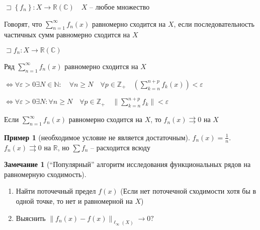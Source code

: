 \documentclass{book}
\newcommand\N{\ensuremath{\mathbb{N}}}
\newcommand\R{\ensuremath{\mathbb{R}}}
\newcommand\Z{\ensuremath{\mathbb{Z}}}
\renewcommand\C{\ensuremath{\mathbb{C}}}
\theoremstyle{definition}
\newtheorem*{note}{Замечание}
\newtheorem*{example}{Пример}
\begin{document}
    \begin{definition}
        $\sqsupset \left\{ f_n \right\}: X\to \R(\C)\quad X$ -- любое множество

        Говорят, что $\sum_{n=1}^{\infty } f_n(x)$ равномерно сходится на $X$, если последовательность частичных сумм равномерно сходится на  $X$
    \end{definition}

    \begin{theorem}

        $\sqsupset f_n: X\to \R(\C)$

        Ряд $\sum_{n=1}^{\infty } f_n(x)$ равномерно сходится на $X $

        $\iff  \forall \varepsilon>0 \exists N\in \N :\quad \forall n\geqslant N\quad \forall p\in \Z _+\quad \left(\sum_{k=n}^{n+p} f_k(x)\right)<\varepsilon$

        $ \iff \forall \varepsilon >0 \exists N: \forall n\geqslant N\quad \forall p\in \Z _+\quad \|\sum_{k=n}^{n+p} f_k\|<\varepsilon$
    \end{theorem}

    \begin{theorem}

        Если $\sum_{n=1}^{\infty } f_n(x)$ равномерно сходится на $X$, то  $f_n(x)\rightrightarrows 0$ на  $X$
    \end{theorem}

    \begin{example}
        [необходимое условие не является достаточным]

        $f_n(x) = \frac{1}{n}$. $f_n(x)\rightrightarrows 0$ на $\R$, но $\sum f_n$ -- расходится всюду
    \end{example}

    \begin{note}
        [``Популярный'' алгоритм исследования функциональных рядов на равномерную сходимость]

        \begin{enumerate}
            \item Найти поточечный предел $f(x)$
                (Если нет поточечной сходимости хотя бы в одной точке, то нет и равномерной на $X$)
            \item Выяснить $\|f_n(x) - f(x)\|_{\ell _{\infty }(X)}\to 0?$
        \end{enumerate}
    \end{note}
\end{document}
